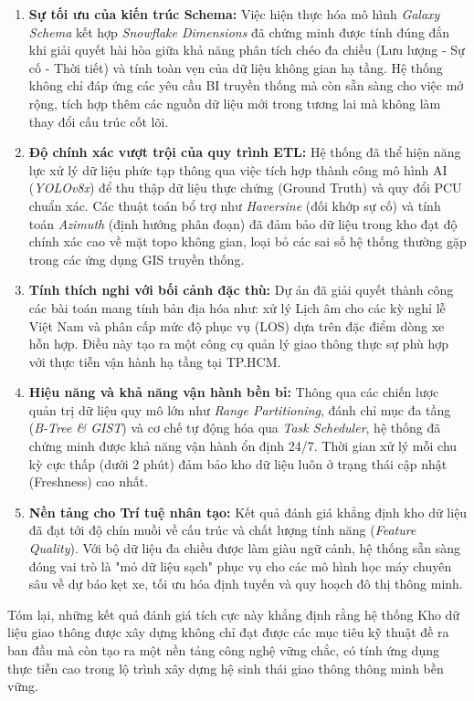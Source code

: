\begin{enumerate}
    \item \textbf{Sự tối ưu của kiến trúc Schema:} Việc hiện thực hóa mô hình \textit{Galaxy Schema} kết hợp \textit{Snowflake Dimensions} đã chứng minh được tính đúng đắn khi giải quyết hài hòa giữa khả năng phân tích chéo đa chiều (Lưu lượng - Sự cố - Thời tiết) và tính toàn vẹn của dữ liệu không gian hạ tầng. Hệ thống không chỉ đáp ứng các yêu cầu BI truyền thống mà còn sẵn sàng cho việc mở rộng, tích hợp thêm các nguồn dữ liệu mới trong tương lai mà không làm thay đổi cấu trúc cốt lõi.
    
    \item \textbf{Độ chính xác vượt trội của quy trình ETL:} Hệ thống đã thể hiện năng lực xử lý dữ liệu phức tạp thông qua việc tích hợp thành công mô hình AI (\textit{YOLOv8x}) để thu thập dữ liệu thực chứng (Ground Truth) và quy đổi PCU chuẩn xác. Các thuật toán bổ trợ như \textit{Haversine} (đối khớp sự cố) và tính toán \textit{Azimuth} (định hướng phân đoạn) đã đảm bảo dữ liệu trong kho đạt độ chính xác cao về mặt topo không gian, loại bỏ các sai số hệ thống thường gặp trong các ứng dụng GIS truyền thống.
    
    \item \textbf{Tính thích nghi với bối cảnh đặc thù:} Dự án đã giải quyết thành công các bài toán mang tính bản địa hóa như: xử lý Lịch âm cho các kỳ nghỉ lễ Việt Nam và phân cấp mức độ phục vụ (LOS) dựa trên đặc điểm dòng xe hỗn hợp. Điều này tạo ra một công cụ quản lý giao thông thực sự phù hợp với thực tiễn vận hành hạ tầng tại TP.HCM.
    
    \item \textbf{Hiệu năng và khả năng vận hành bền bỉ:} Thông qua các chiến lược quản trị dữ liệu quy mô lớn như \textit{Range Partitioning}, đánh chỉ mục đa tầng (\textit{B-Tree \& GIST}) và cơ chế tự động hóa qua \textit{Task Scheduler}, hệ thống đã chứng minh được khả năng vận hành ổn định 24/7. Thời gian xử lý mỗi chu kỳ cực thấp (dưới 2 phút) đảm bảo kho dữ liệu luôn ở trạng thái cập nhật (Freshness) cao nhất.
    
    \item \textbf{Nền tảng cho Trí tuệ nhân tạo:} Kết quả đánh giá khẳng định kho dữ liệu đã đạt tới độ chín muồi về cấu trúc và chất lượng tính năng (\textit{Feature Quality}). Với bộ dữ liệu đa chiều được làm giàu ngữ cảnh, hệ thống sẵn sàng đóng vai trò là "mỏ dữ liệu sạch" phục vụ cho các mô hình học máy chuyên sâu về dự báo kẹt xe, tối ưu hóa định tuyến và quy hoạch đô thị thông minh.
\end{enumerate}

Tóm lại, những kết quả đánh giá tích cực này khẳng định rằng hệ thống Kho dữ liệu giao thông được xây dựng không chỉ đạt được các mục tiêu kỹ thuật đề ra ban đầu mà còn tạo ra một nền tảng công nghệ vững chắc, có tính ứng dụng thực tiễn cao trong lộ trình xây dựng hệ sinh thái giao thông thông minh bền vững.
